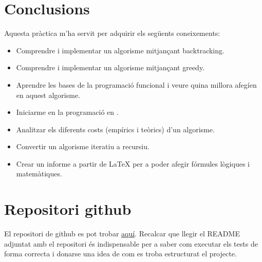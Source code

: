 \documentclass[12pt, letterpaper]{article}
\begin{document}
\section{Conclusions}
Aquesta pràctica m'ha servit per adquirir els següents coneixements:
\begin{itemize}
    \item Comprendre i implementar un algorisme mitjançant backtracking.
    \item Comprendre i implementar un algorisme mitjançant greedy.
    \item Aprendre les bases de la programació funcional i veure quina millora afegíen en aquest algorisme.
    \item Iniciarme en la programació en \cpluspluslogo.
    \item Analitzar els diferents costs (empírics i teòrics) d'un algorisme.
    \item Convertir un algorisme iteratiu a recursiu.
    \item Crear un informe a partir de {\LaTeX} per a poder afegir fórmules lògiques i matemàtiques.
\end{itemize}

\newpage

\appendix

\section{Repositori github}
\label{github}

El repositori de github es pot trobar \href{https://github.com/Algorismia/Aquaeductus-Optimus}{aquí}. Recalcar que llegir el README adjuntat amb el repositori és indispensable per a saber com executar els tests de forma correcta i donarse una idea de com es troba estructurat el projecte. 
\end{document}
